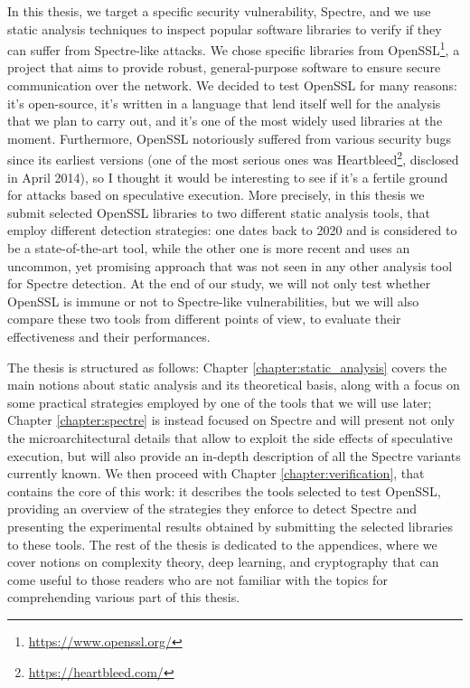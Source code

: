 \documentclass[12pt,a4paper]{book}
\theoremstyle{definition}
\begin{document}
	In this thesis, we target a specific security vulnerability, Spectre, and we use static analysis techniques to inspect popular software libraries to verify if they can suffer from Spectre-like attacks. We chose specific libraries from OpenSSL\footnote{\url{https://www.openssl.org/}}, a project that aims to provide robust, general-purpose software to ensure secure communication over the network. We decided to test OpenSSL for many reasons: it's open-source, it's written in a language that lend itself well for the analysis that we plan to carry out, and it's one of the most widely used libraries at the moment. Furthermore, OpenSSL notoriously suffered from various security bugs since its earliest versions (one of the most serious ones was Heartbleed\footnote{\url{https://heartbleed.com/}}, disclosed in April 2014), so I thought it would be interesting to see if it's a fertile ground for attacks based on speculative execution. More precisely, in this thesis we submit selected OpenSSL libraries to two different static analysis tools, that employ different detection strategies: one dates back to 2020 and is considered to be a state-of-the-art tool, while the other one is more recent and uses an uncommon, yet promising approach that was not seen in any other analysis tool for Spectre detection. At the end of our study, we will not only test whether OpenSSL is immune or not to Spectre-like vulnerabilities, but we will also compare these two tools from different points of view, to evaluate their effectiveness and their performances.
	
	The thesis is structured as follows: Chapter \ref{chapter:static_analysis} covers the main notions about static analysis and its theoretical basis, along with a focus on some practical strategies employed by one of the tools that we will use later; Chapter \ref{chapter:spectre} is instead focused on Spectre and will present not only the microarchitectural details that allow to exploit the side effects of speculative execution, but will also provide an in-depth description of all the Spectre variants currently known. We then proceed with Chapter \ref{chapter:verification}, that contains the core of this work: it describes the tools selected to test OpenSSL, providing an overview of the strategies they enforce to detect Spectre and presenting the experimental results obtained by submitting the selected libraries to these tools. The rest of the thesis is dedicated to the appendices, where we cover notions on complexity theory, deep learning, and cryptography that can come useful to those readers who are not familiar with the topics for comprehending various part of this thesis.
	
\end{document}
